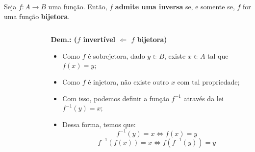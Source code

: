 \begin{frame}
  \begin{theorem}
    Seja $f:A\rightarrow B$ uma função. Então, $f$ \textbf{admite uma inversa} se, e somente se, $f$ for uma função \textbf{bijetora}.
  \end{theorem}
  \begin{columns}[onlytextwidth]
    \begin{column}{0.49\textwidth}
      \begin{figure}
      \end{figure}
    \end{column}
    \begin{column}{0.49\textwidth}
      \begin{highlight}
        \textbf{Dem.: ($f$ invertível $\Leftarrow$ $f$ bijetora)}
        \begin{itemize}
          \item Como $f$ é sobrejetora, dado $y\in B$, existe $x\in A$ tal que $f(x) = y$;
          \item Como $f$ é injetora, não existe outro $x$ com tal propriedade;
          \item Com isso, podemos definir a função $f^{-1}$ através da lei $f^{-1}(y)=x$;
          \item Dessa forma, temos que:
          \begin{equation*}
            f^{-1}(y) = x \Leftrightarrow f(x) = y
          \end{equation*}
          \begin{equation*}
            f^{-1}(f(x)) = x \Leftrightarrow f(f^{-1}(y)) = y
          \end{equation*}
        \end{itemize}
      \end{highlight}
    \end{column}
  \end{columns}
\end{frame}

